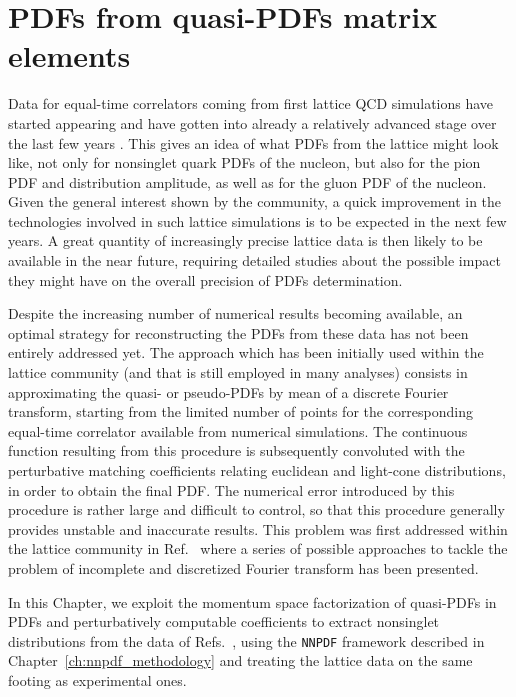 \chapter{PDFs from quasi-PDFs matrix elements}
Data for equal-time correlators coming from first lattice QCD simulations
have started appearing and have gotten into already a relatively advanced stage over the last few years
\cite{Lin:2014zya,Alexandrou:2015rja,Chen:2016utp,Alexandrou:2016jqi,Zhang:2017bzy,Alexandrou:2017huk,Lin:2017ani,Chen:2017gck,Alexandrou:2018pbm,Chen:2018xof,Chen:2018fwa,Alexandrou:2018eet,Liu:2018uuj,Lin:2018qky,Fan:2018dxu,Liu:2018hxv,Alexandrou:2019lfo,Izubuchi:2019lyk}.
This gives an idea of what PDFs from the lattice might look like, not only for
nonsinglet quark PDFs of the nucleon, but also for the pion PDF and distribution
amplitude, as well as for the gluon PDF of the nucleon. Given the general
interest shown by the community, a quick improvement in the technologies
involved in such lattice simulations is to be expected in the next few years. A
great quantity of increasingly precise lattice data is then likely to be
available in the near future, requiring detailed studies about the possible
impact they might have on the overall precision of PDFs determination.

Despite the increasing number of numerical results becoming available, an
optimal strategy for reconstructing the PDFs from these data has not been
entirely addressed yet. The approach which has been initially used within the lattice community
(and that is still employed in many analyses)
consists in approximating the quasi- or pseudo-PDFs by mean of a discrete Fourier transform,
starting from the limited number of points for the corresponding equal-time correlator available from numerical simulations. 
The continuous function resulting from this procedure
is subsequently convoluted with the perturbative matching coefficients relating euclidean and light-cone distributions,
in order to obtain the final PDF.
The numerical error introduced by this procedure is rather large and difficult to control,
so that this procedure generally provides unstable and inaccurate results.
This problem was first addressed within the lattice community in Ref.~\cite{Karpie2019}
where a series of possible approaches to tackle the problem of incomplete and discretized Fourier
transform has been presented.

In this Chapter, we exploit the momentum space factorization of quasi-PDFs in PDFs and perturbatively
computable coefficients to extract nonsinglet distributions from the data of
Refs.~\cite{Alexandrou:2018pbm,Alexandrou:2019lfo}, using the {\tt NNPDF} framework described
in Chapter~\ref{ch:nnpdf_methodology} and treating the lattice data on the same footing as experimental ones.

